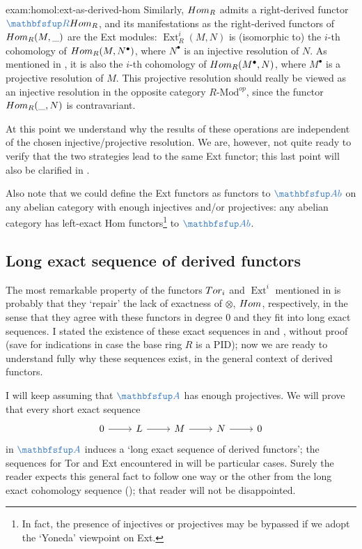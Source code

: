 \begin{exam}{}{exam:homol:ext-as-derived-hom}
  Similarly, $Hom_R$ admits a right-derived functor
  $\categ{R}\Hom_R$, and its manifestations as the right-derived
  functors of $Hom_R(M, \_)$ are the Ext modules:
  $\operatorname{Ext}^i_R(M, N)$ is (isomorphic to) the $i$-th
  cohomology of $Hom_R(M, N^\bullet)$, where $N^\bullet$ is an
  injective resolution of $N$. As mentioned in
  , it is also the $i$-th
  cohomology of $Hom_R(M^\bullet, N)$, where $M^\bullet$ is a
  projective resolution of $M$. This projective resolution should
  really be viewed as an injective resolution in the opposite category
  $R\text{-Mod}^{op}$, since the functor $Hom_R(\_, N)$ is
  contravariant.

  At this point we understand why the results of these operations are
  independent of the chosen injective/projective resolution. We are,
  however, not quite ready to verify that the two strategies lead to
  the same Ext functor; this last point will also be clarified in
  .

  Also note that we could define the Ext functors as functors to
  $\categ{Ab}$ on any abelian category with enough injectives and/or
  projectives: any abelian category has left-exact Hom
  functors\footnote{In fact, the presence of injectives or projectives
    may be bypassed if we adopt the `Yoneda' viewpoint on Ext.} to
  $\categ{Ab}$.
\end{exam}

\subsection{Long exact sequence of derived functors}
\label{subsec:homol:long-exact-sequence-of-derived-functors}

The most remarkable property of the functors $Tor_i$ and
$\operatorname{Ext}^i$ mentioned in  is probably
that they `repair' the lack of exactness of $\otimes$, $Hom$,
respectively, in the sense that they agree with these functors in
degree $0$ and they fit into long exact sequences. I stated the
existence of these exact sequences in
 and
, without proof (save for
indications in case the base ring $R$ is a PID); now we are ready to
understand fully why these sequences exist, in the general context of
derived functors.

I will keep assuming that $\categ{A}$ has enough projectives. We will
prove that every short exact sequence
\[\begin{tikzcd}
    0 \arrow[r] & L \arrow[r] & M \arrow[r] & N \arrow[r] & 0
  \end{tikzcd}\] in $\categ{A}$ induces a `long exact sequence of
derived functors'; the sequences for Tor and Ext encountered in
 will be particular cases. Surely the reader expects
this general fact to follow one way or the other from the long exact
cohomology sequence (); that reader will not be
disappointed.

